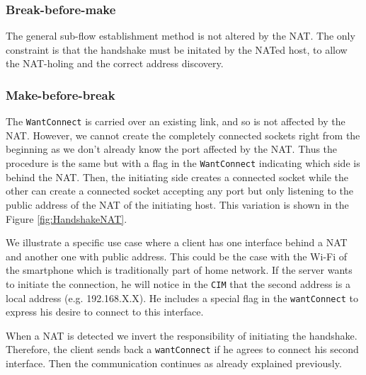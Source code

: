 \subsubsection{Break-before-make}
The general sub-flow establishment method is not altered by the NAT. The only constraint is that the handshake must be initated by the NATed host, to allow the NAT-holing and the correct address discovery.

\subsubsection{Make-before-break}
The \verb!WantConnect! is carried over an existing link, and so is not affected by the NAT. However, we cannot create the completely connected sockets right from the beginning as we don't already know the port affected by the NAT. Thus the procedure is the same but with a flag in the \verb!WantConnect! indicating which side is behind the NAT. Then, the initiating side creates a connected socket while the other can create a connected socket accepting any port but only listening to the public address of the NAT of the initiating host. This variation is shown in the Figure \ref{fig:HandshakeNAT}. 

We illustrate a specific use case where a client has one interface behind a NAT and another one with public address. This could be the case with the Wi-Fi of the smartphone which is traditionally part of home network. If the server wants to initiate the connection, he will notice in the \verb!CIM! that the second address is a local address (e.g. 192.168.X.X). He includes a special flag in the \verb!wantConnect! to express his desire to connect to this interface. 

When a NAT is detected we invert the responsibility of initiating the handshake. Therefore, the client sends back a \verb!wantConnect! if he agrees to connect his second interface. Then the communication continues as already explained previously. 

